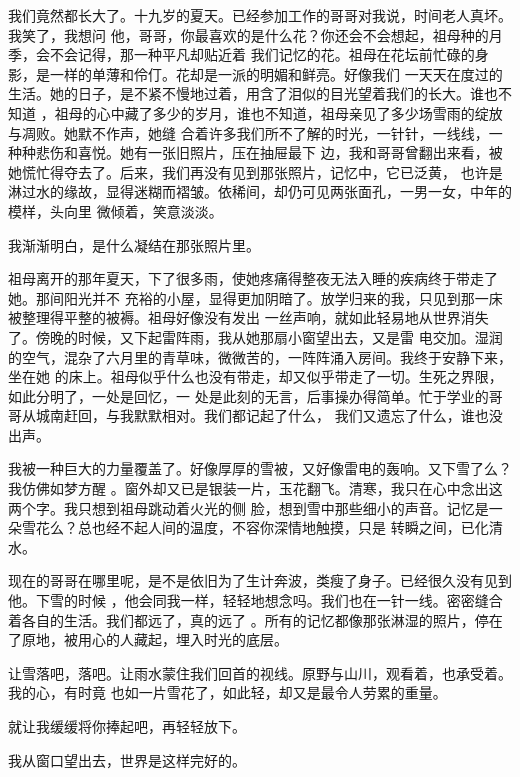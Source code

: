 \documentclass[12pt,a4paper]{article}
\begin{document}
		我们竟然都长大了。十九岁的夏天。已经参加工作的哥哥对我说，时间老人真坏。我笑了，我想问
	他，哥哥，你最喜欢的是什么花？你还会不会想起，祖母种的月季，会不会记得，那一种平凡却贴近着
	我们记忆的花。祖母在花坛前忙碌的身影，是一样的单薄和伶仃。花却是一派的明媚和鲜亮。好像我们
	一天天在度过的生活。她的日子，是不紧不慢地过着，用含了泪似的目光望着我们的长大。谁也不知道
	，祖母的心中藏了多少的岁月，谁也不知道，祖母亲见了多少场雪雨的绽放与凋败。她默不作声，她缝
	合着许多我们所不了解的时光，一针针，一线线，一种种悲伤和喜悦。她有一张旧照片，压在抽屉最下
	边，我和哥哥曾翻出来看，被她慌忙得夺去了。后来，我们再没有见到那张照片，记忆中，它已泛黄，
	也许是淋过水的缘故，显得迷糊而褶皱。依稀间，却仍可见两张面孔，一男一女，中年的模样，头向里
	微倾着，笑意淡淡。

		我渐渐明白，是什么凝结在那张照片里。

		祖母离开的那年夏天，下了很多雨，使她疼痛得整夜无法入睡的疾病终于带走了她。那间阳光并不
	充裕的小屋，显得更加阴暗了。放学归来的我，只见到那一床被整理得平整的被褥。祖母好像没有发出
	一丝声响，就如此轻易地从世界消失了。傍晚的时候，又下起雷阵雨，我从她那扇小窗望出去，又是雷
	电交加。湿润的空气，混杂了六月里的青草味，微微苦的，一阵阵涌入房间。我终于安静下来，坐在她
	的床上。祖母似乎什么也没有带走，却又似乎带走了一切。生死之界限，如此分明了，一处是回忆，一
	处是此刻的无言，后事操办得简单。忙于学业的哥哥从城南赶回，与我默默相对。我们都记起了什么，
	我们又遗忘了什么，谁也没出声。

		我被一种巨大的力量覆盖了。好像厚厚的雪被，又好像雷电的轰响。又下雪了么？我仿佛如梦方醒
	。窗外却又已是银装一片，玉花翻飞。清寒，我只在心中念出这两个字。我只想到祖母跳动着火光的侧
	脸，想到雪中那些细小的声音。记忆是一朵雪花么？总也经不起人间的温度，不容你深情地触摸，只是
	转瞬之间，已化清水。

		现在的哥哥在哪里呢，是不是依旧为了生计奔波，类瘦了身子。已经很久没有见到他。下雪的时候
	，他会同我一样，轻轻地想念吗。我们也在一针一线。密密缝合着各自的生活。我们都远了，真的远了
	。所有的记忆都像那张淋湿的照片，停在了原地，被用心的人藏起，埋入时光的底层。

		让雪落吧，落吧。让雨水蒙住我们回首的视线。原野与山川，观看着，也承受着。我的心，有时竟
	也如一片雪花了，如此轻，却又是最令人劳累的重量。

		就让我缓缓将你捧起吧，再轻轻放下。

		我从窗口望出去，世界是这样完好的。

	\endwriting
	\fi
\end{document}
